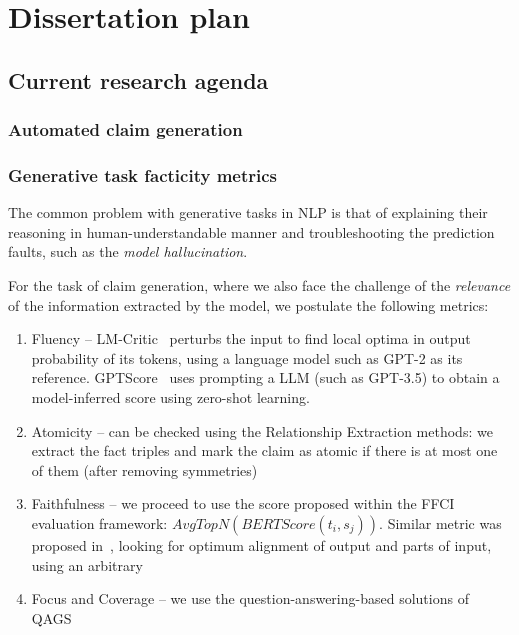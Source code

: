 
\chapter{Dissertation plan}
\label{chap:plan}

\section{Current research agenda}
\subsection{Automated claim generation}
\todo{}
\subsection{Generative task facticity metrics}
The common problem with generative tasks in NLP is that of explaining their reasoning in human-understandable manner and troubleshooting the prediction faults, such as the \textit{model hallucination}.

For the task of claim generation, where we also face the challenge of the \textit{relevance} of the information extracted by the model, we postulate the following metrics:

\begin{enumerate}
    \item {\techbf Fluency} -- \textsf{LM-Critic}~\cite{yasunaga-etal-2021-lm} perturbs the input to find local optima in output probability of its tokens, using a language model such as GPT-2 as its reference. \textsf{GPTScore}~\cite{fu2023gptscore} uses prompting a LLM (such as GPT-3.5) to obtain a model-inferred score using zero-shot learning.
    \item {\techbf Atomicity} -- can be checked using the Relationship Extraction methods: we extract the fact triples and mark the claim as atomic if there is at most one of them (after removing symmetries)
    \item {\techbf Faithfulness} -- we proceed to use the score proposed within the FFCI evaluation framework: $AvgTopN(BERTScore(t_i,s_j))$. Similar metric was proposed in~\cite{zha2023alignscore}, looking for optimum alignment of output and parts of input, using an arbitrary 
    \item {\techbf Focus and Coverage} -- we use the question-answering-based solutions of QAGS~\cite{wang-etal-2020-asking}
\end{enumerate}

